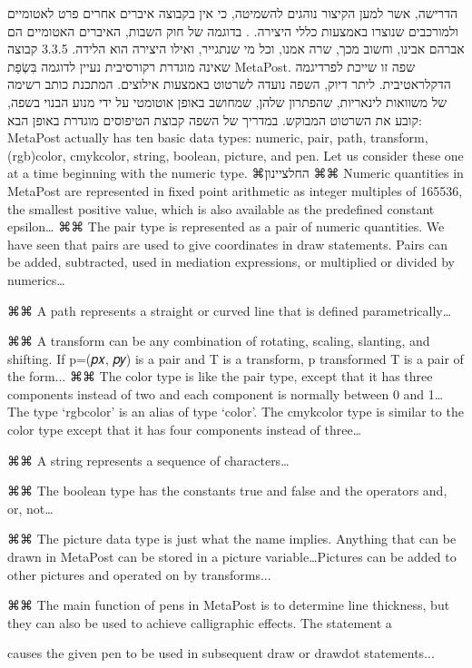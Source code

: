 הדרישה, אשר למען הקיצור נוהגים להשמיטה, כי אין בקבוצה איברים אחרים פרט לאטומיים ולמורכבים שנוצרו באמצעות כללי היצירה. .
בדוגמה של חוק השבות, האיברים האטומיים הם אברהם אבינו, וחשוב מכך, שרה אמנו, וכל מי שנתגייר, ואילו היצירה הוא הלידה.
​3.3.5​ קבוצה שאינה מוגדרת רקורסיבית
נעיין לדוגמה בִּשְׂפַת MetaPost. שפה זו שייכת לפרדיגמה הדקלראטיבית. ליתר דיוק, השפה נועדה לשרטוט באמצעות אילוצים. המתכנת כותב רשימה של משוואות לינאריות, שהפתרון שלהן, שמחושב באופן אוטומטי על ידי מנוע הבנוי בשפה, קובע את השרטוט המבוקש.
 במדריך של השפה קבוצת הטיפוסים מוגדרת באופן הבא:
MetaPost actually has ten basic data types: numeric, pair, path, transform, (rgb)color, cmykcolor, string, boolean, picture, and pen. Let us consider these one at a time beginning with the numeric type.
⌘החל{ציינון}
⌘⌘ Numeric quantities in MetaPost are represented in fixed point arithmetic as
integer multiples of 165536, the smallest positive value, which is also
available as the predefined constant epsilon…
⌘⌘
The pair type is represented as a pair of numeric quantities. We have seen that pairs are used to give coordinates in draw statements. Pairs can be added, subtracted, used in mediation expressions, or multiplied or divided by numerics…

⌘⌘ A path represents a straight or curved line that is defined parametrically…

⌘⌘ A transform can be any combination of rotating, scaling, slanting, and
shifting. If p=(𝑝𝑥, 𝑝𝑦) is a pair and T is a transform, p transformed T
is a pair of the form...
⌘⌘ The color type is like the pair type, except that it has three components
instead of two and each component is normally between 0 and 1…The type
‘rgbcolor’ is an alias of type ‘color’. The cmykcolor type is similar to the
color type except that it has four components instead of three…

⌘⌘ A string represents a sequence of characters…

⌘⌘ The boolean type has the constants true and false and the operators and, or,
not…

⌘⌘ The picture data type is just what the name implies. Anything that can be
drawn in MetaPost can be stored in a picture variable…Pictures can be added to
other pictures and operated on by transforms...

⌘⌘ The main function of pens in MetaPost is to determine line thickness, but
they can also be used to achieve calligraphic effects. The statement a

 causes the given pen to be used
in subsequent draw or drawdot statements...

